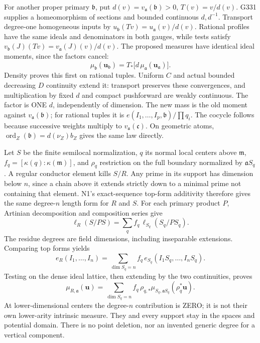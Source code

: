 \documentclass[11pt]{article}
\begin{document}
For another proper primary \(\mathfrak b\), put \(d(v)=v_{\mathfrak a}(\mathfrak b)>0\), \(T(v)=v/d(v)\). G331 supplies a homeomorphism of sections and bounded continuous \(d,d^{-1}\). Transport degree-one homogeneous inputs by \(u_{\mathfrak b}(Tv)=u_{\mathfrak a}(v)/d(v)\). Rational profiles have the same ideals and denominators in both gauges, while tests satisfy \(v_{\mathfrak b}(J)(Tv)=v_{\mathfrak a}(J)(v)/d(v)\). The proposed measures have identical ideal moments, since the factors cancel:
\[
\mu_{\mathfrak b}(\boldsymbol u_{\mathfrak b})
=T_*\big[d\,\mu_{\mathfrak a}(\boldsymbol u_{\mathfrak a})\big]. \tag{GAUGE}
\]
Density proves this first on rational tuples. Uniform \(C\) and actual bounded decreasing \(D\) continuity extend it: transport preserves these convergences, and multiplication by fixed \(d\) and compact pushforward are weakly continuous. The factor is ONE \(d\), independently of dimension. The new mass is the old moment against \(v_{\mathfrak a}(\mathfrak b)\); for rational tuples it is \(e(I_1,\ldots,I_p,\mathfrak b)/\prod q_i\). The cocycle follows because successive weights multiply to \(v_{\mathfrak a}(\mathfrak c)\). On geometric atoms, \(\operatorname{ord}_Z(\mathfrak b)=d(\nu_Z)b_Z\) gives the same law directly.

Let \(S\) be the finite semilocal normalization, \(q\) its normal local centers above \(\mathfrak m\), \(f_q=[\kappa(q):\kappa(\mathfrak m)]\), and \(\rho_q\) restriction on the full boundary normalized by \(\mathfrak aS_q\). A regular conductor element kills \(S/R\). Any prime in its support has dimension below \(n\), since a chain above it extends strictly down to a minimal prime not containing that element. N1's exact-sequence top-form additivity therefore gives the same degree-\(n\) length form for \(R\) and \(S\). For each primary product \(P\), Artinian decomposition and composition series give
\[
\ell_R(S/PS)=\sum_q f_q\,\ell_{S_q}(S_q/PS_q).
\]
The residue degrees are field dimensions, including inseparable extensions. Comparing top forms yields
\[
e_R(I_1,\ldots,I_n)
=\sum_{\dim S_q=n}f_q\,e_{S_q}(I_1S_q,\ldots,I_nS_q).
\]
Testing on the dense ideal lattice, then extending by the two continuities, proves
\[
\mu_{R,\mathfrak a}(\boldsymbol u)
=\sum_{\dim S_q=n}f_q\,\rho_{q,*}
 \mu_{S_q,\mathfrak aS_q}(\rho_q^*\boldsymbol u). \tag{NORMAL}
\]
At lower-dimensional centers the degree-\(n\) contribution is ZERO; it is not their own lower-arity intrinsic measure. They and every support stay in the spaces and potential domain. There is no point deletion, nor an invented generic degree for a vertical component.
\end{document}
